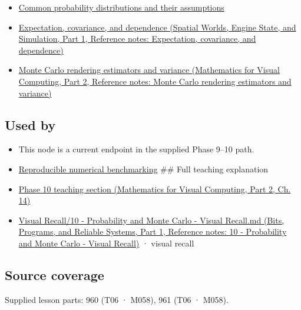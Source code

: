 \begin{itemize}
\tightlist
\item
  \hyperref[appendix-a2360b435383]{Common probability distributions and their assumptions}
\item
  \href{../05-Spatial-Worlds-Engine-State-and-Simulation-P01/main.pdf\#nameddest=appendix-54c383df9992}{Expectation, covariance, and dependence (Spatial Worlds, Engine State, and Simulation, Part 1, Reference notes: Expectation, covariance, and dependence)}
\item
  \href{../02-Mathematics-for-Visual-Computing-P02/main.pdf\#nameddest=appendix-031e02bf28af}{Monte Carlo rendering estimators and variance (Mathematics for Visual Computing, Part 2, Reference notes: Monte Carlo rendering estimators and variance)}
\end{itemize}

\subsection{Used by}\label{appendix-c83016554b1e-used-by}

\hypertarget{appendix-c83016554b1e-used-by}{}

\begin{itemize}
\item
  This node is a current endpoint in the supplied Phase 9--10 path.
\item
  \hyperref[appendix-b9db93e28371]{Reproducible numerical benchmarking} \#\# Full teaching explanation
\item
  \href{../02-Mathematics-for-Visual-Computing-P02/main.pdf\#nameddest=02-foundations-ii-ch030-inference-and-error-metrics-need-explicit-assumptions}{Phase 10 teaching section (Mathematics for Visual Computing, Part 2, Ch. 14)}
\item
  \href{../01-Bits-Programs-and-Reliable-Systems-P01/main.pdf\#nameddest=appendix-cb5af353ef77}{Visual Recall/10 - Probability and Monte Carlo - Visual Recall.md (Bits, Programs, and Reliable Systems, Part 1, Reference notes: 10 - Probability and Monte Carlo - Visual Recall)} · visual recall
\end{itemize}

\subsection{Source coverage}\label{appendix-c83016554b1e-source-coverage}

\hypertarget{appendix-c83016554b1e-source-coverage}{}

Supplied lesson parts: 960 (T06 · M058), 961 (T06 · M058).
